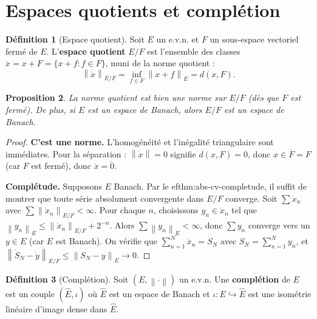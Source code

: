 \documentclass[a4paper,12pt]{book}
\newcommand{\norm}[1]{\left\| #1 \right\|}
\theoremstyle{definition}
\newtheorem{definition}{Définition}[chapter]
\theoremstyle{plain}
\newtheorem{proposition}[definition]{Proposition}
\theoremstyle{remark}
\begin{document}
\section{Espaces quotients et complétion}

\begin{definition}[Espace quotient]\label{def:espace-quotient}
Soit $E$ un e.v.n. et $F$ un sous-espace vectoriel fermé de $E$. L'\textbf{espace quotient} $E/F$ est l'ensemble des classes $\dot{x} = x + F = \{x + f : f \in F\}$, muni de la norme quotient :
\[
    \norm{\dot{x}}_{E/F} = \inf_{f \in F} \norm{x + f}_E = d(x, F).
\]
\end{definition}

\begin{proposition}\label{prop:quotient-norme}
La norme quotient est bien une norme sur $E/F$ (dès que $F$ est fermé). De plus, si $E$ est un espace de Banach, alors $E/F$ est un espace de Banach.
\end{proposition}

\begin{proof}
\textbf{C'est une norme.} L'homogénéité et l'inégalité triangulaire sont immédiates. Pour la séparation : $\norm{\dot{x}} = 0$ signifie $d(x, F) = 0$, donc $x \in \overline{F} = F$ (car $F$ est fermé), donc $\dot{x} = \dot{0}$.

\textbf{Complétude.} Supposons $E$ Banach. Par le 
ef{thm:abs-cv-completude}, il suffit de montrer que toute série absolument convergente dans $E/F$ converge. Soit $\sum \dot{x}_n$ avec $\sum \norm{\dot{x}_n}_{E/F} < \infty$. Pour chaque $n$, choisissons $y_n \in \dot{x}_n$ tel que $\norm{y_n}_E \leq \norm{\dot{x}_n}_{E/F} + 2^{-n}$. Alors $\sum \norm{y_n}_E < \infty$, donc $\sum y_n$ converge vers un $y \in E$ (car $E$ est Banach). On vérifie que $\sum_{n=1}^N \dot{x}_n = \dot{S}_N$ avec $S_N = \sum_{n=1}^N y_n$, et $\norm{\dot{S}_N - \dot{y}}_{E/F} \leq \norm{S_N - y}_E \to 0$.
\end{proof}

\begin{definition}[Complétion]\label{def:completion}
Soit $(E, \norm{\cdot})$ un e.v.n. Une \textbf{complétion} de $E$ est un couple $(\hat{E}, \iota)$ où $\hat{E}$ est un espace de Banach et $\iota : E \hookrightarrow \hat{E}$ est une isométrie linéaire d'image dense dans $\hat{E}$.
\end{definition}
\end{document}
